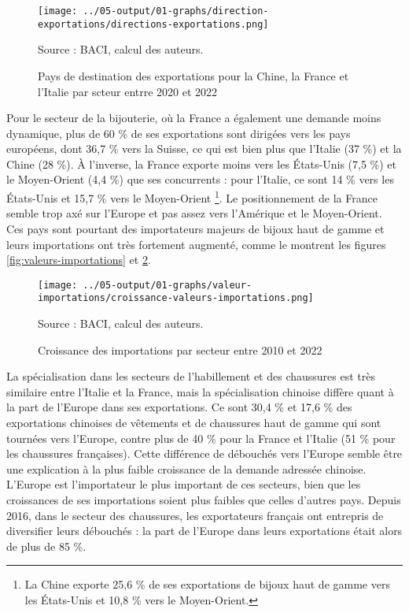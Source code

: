 \documentclass[french,10pt,a4paper]{article}
\begin{document}
\begin{figure}[!h]
  \centering
  \texttt{[image: ../05-output/01-graphs/direction-exportations/directions-exportations.png]}
  \captionsetup{justification=raggedright,singlelinecheck=false, font=small}
  \caption*{Source : BACI, calcul des auteurs.}
  \captionsetup{justification=centering, singlelinecheck=true, font=normalsize}
  \caption{Pays de destination des exportations pour la Chine, la France et l'Italie par scteur entrre 2020 et 2022}
  \label{fig:direction-exportations}
\end{figure}

Pour le secteur de la bijouterie, où la France a également une demande moins dynamique, plus de 60 \% de ses exportations sont dirigées vers les pays européens, dont 36,7 \% vers la Suisse, ce qui est bien plus que l'Italie (37 \%) et la Chine (28 \%). À l'inverse, la France exporte moins vers les États-Unis (7,5 \%) et le Moyen-Orient (4,4 \%) que ses concurrents : pour l'Italie, ce sont 14 \% vers les États-Unis et 15,7 \% vers le Moyen-Orient \footnote{La Chine exporte 25,6 \% de ses exportations de bijoux haut de gamme vers les États-Unis et 10,8 \% vers le Moyen-Orient.}. Le positionnement de la France semble trop axé sur l'Europe et pas assez vers l'Amérique et le Moyen-Orient. Ces pays sont pourtant des importateurs majeurs de bijoux haut de gamme et leurs importations ont très fortement augmenté, comme le montrent les figures \ref{fig:valeurs-importations} et \ref{fig:croissance-valeurs-importations}.

\begin{figure}[!h]
  \centering
  \texttt{[image: ../05-output/01-graphs/valeur-importations/croissance-valeurs-importations.png]}
  \captionsetup{justification=raggedright,singlelinecheck=false, font=small}
  \caption*{Source : BACI, calcul des auteurs.}
  \captionsetup{justification=centering, singlelinecheck=true, font=normalsize}
  \caption{Croissance des importations par secteur entre 2010 et 2022}
  \label{fig:croissance-valeurs-importations}
\end{figure}

La spécialisation dans les secteurs de l'habillement et des chaussures est très similaire entre l'Italie et la France, mais la spécialisation chinoise diffère quant à la part de l'Europe dans ses exportations. Ce sont 30,4 \% et 17,6 \% des exportations chinoises de vêtements et de chaussures haut de gamme qui sont tournées vers l'Europe, contre plus de 40 \% pour la France et l’Italie (51 \% pour les chaussures françaises). Cette différence de débouchés vers l'Europe semble être une explication à la plus faible croissance de la demande adressée chinoise. L'Europe est l'importateur le plus important de ces secteurs, bien que les croissances de ses importations soient plus faibles que celles d'autres pays. Depuis 2016, dans le secteur des chaussures, les exportateurs français ont entrepris de diversifier leurs débouchés : la part de l'Europe dans leurs exportations était alors de plus de 85 \%.
\end{document}
